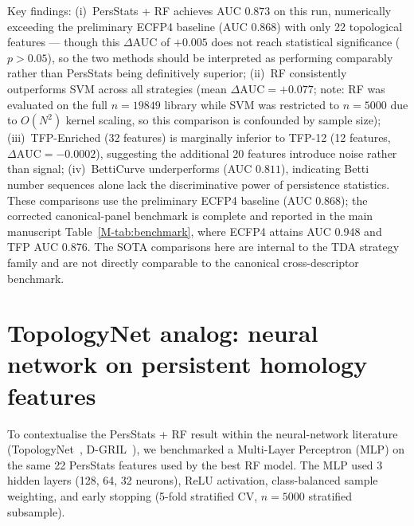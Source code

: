 \documentclass[11pt,a4paper]{article}
\begin{document}
Key findings: (i)~PersStats + RF achieves AUC $0.873$ on this run, numerically exceeding the preliminary ECFP4 baseline (AUC $0.868$) with only 22 topological features --- though this $\Delta$AUC of $+0.005$ does not reach statistical significance ($p > 0.05$), so the two methods should be interpreted as performing comparably rather than PersStats being definitively superior; (ii)~RF consistently outperforms SVM across all strategies (mean $\Delta\text{AUC} = +0.077$; note: RF was evaluated on the full $n = 19849$ library while SVM was restricted to $n = 5000$ due to $O(N^2)$ kernel scaling, so this comparison is confounded by sample size); (iii)~TFP-Enriched (32 features) is marginally inferior to TFP-12 (12 features, $\Delta\text{AUC} = -0.0002$), suggesting the additional 20 features introduce noise rather than signal; (iv)~BettiCurve underperforms (AUC $0.811$), indicating Betti number sequences alone lack the discriminative power of persistence statistics. These comparisons use the preliminary ECFP4 baseline (AUC \num{0.868}); the corrected canonical-panel benchmark is complete  and reported in the main manuscript Table~\cref{M-tab:benchmark}, where ECFP4 attains AUC \num{0.948} and TFP AUC \num{0.876}. The SOTA comparisons here are internal to the TDA strategy family and are not directly comparable to the canonical cross-descriptor benchmark.


\section{TopologyNet analog: neural network on persistent homology features}
\label{sec:topologynet_analog}

To contextualise the PersStats + RF result within the neural-network literature (TopologyNet~\citep{topologynet_2018}, D-GRIL~\citep{dgril_2026}), we benchmarked a Multi-Layer Perceptron (MLP) on the same 22 PersStats features used by the best RF model. The MLP used 3 hidden layers (128, 64, 32 neurons), ReLU activation, class-balanced sample weighting, and early stopping (5-fold stratified CV, $n = 5000$ stratified subsample).
\end{document}
